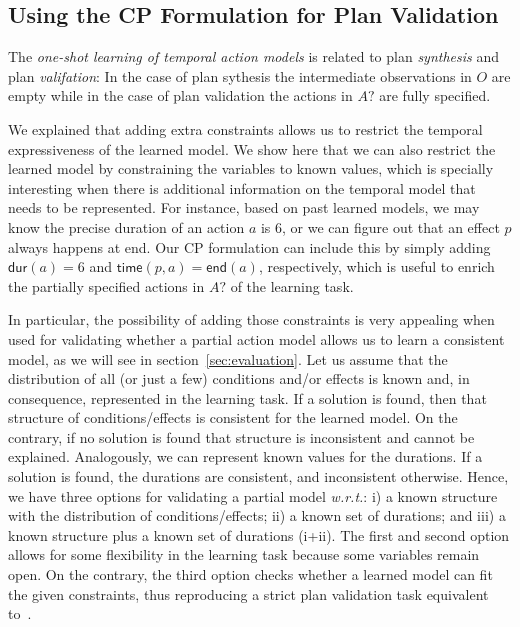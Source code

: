 \documentclass{ecai}
\newcommand{\dur}{\mathsf{dur}}    %
\newcommand{\en}{\mathsf{end}}     %
\newcommand{\tim}{\mathsf{time}}   %
\begin{document}


\subsection{Using the CP Formulation for Plan Validation}
\label{sec:usingCPValidation}
The {\em one-shot learning of temporal action models} is related to plan {\em synthesis} and plan {\em valifation}: In the case of plan sythesis the intermediate observations in $O$ are empty while in the case of plan validation the actions in $A?$ are fully specified.

We explained that adding extra constraints allows us to restrict the temporal expressiveness of the learned model. We show here that we can also restrict the learned model by constraining the variables to known values, which is specially interesting when there is additional information on the temporal model that needs to be represented. For instance, based on past learned models, we may know the precise duration of an action $a$ is 6,
or we can figure out that an effect $p$ always happens at end.
Our CP formulation can include this by simply adding $\dur(a)=6$ and $\tim(p,a)=\en(a)$, respectively, which is useful to enrich the partially specified actions in $A?$ of the learning task.

In particular, the possibility of adding those constraints is very appealing when used for validating whether a partial action model allows us to learn a consistent model, as we will see in section~\ref{sec:evaluation}.
Let us assume that the distribution of all (or just a few) conditions and/or effects is known and, in consequence, represented in the learning task. If a solution is found, then that structure of conditions/effects is consistent for the learned model. On the contrary, if no solution is found that structure is inconsistent and cannot be explained.
Analogously, we can represent known values for the durations. If a solution is found, the durations are consistent, and inconsistent otherwise.
Hence, we have three options for validating a partial model \emph{w.r.t.}: i) a known structure with the distribution of conditions/effects; ii) a known set of durations; and iii) a known structure plus a known set of durations (i+ii).
The first and second option allows for some flexibility in the learning task because some variables remain open. On the contrary, the third option checks whether a learned model can fit the given constraints, thus reproducing a strict plan validation task equivalent to~\cite{howey2004val}.
\end{document}
